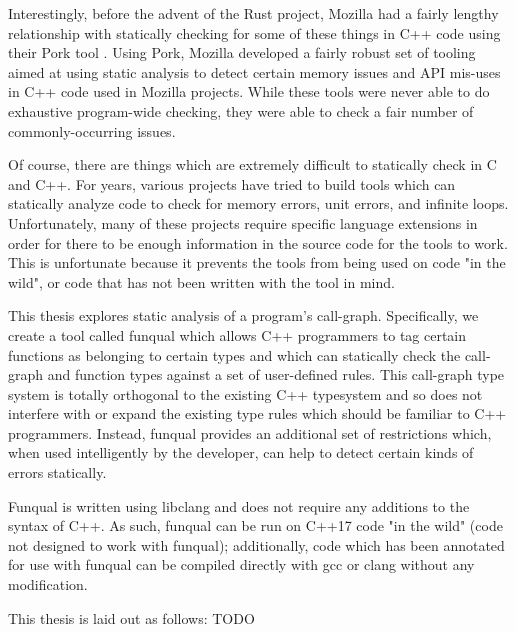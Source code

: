 Interestingly, before the advent of the Rust project, Mozilla had a fairly lengthy relationship with statically checking for some of these things in C++ code using their Pork tool \cite{mozilla-pork, mozilla-pork-blog}.  Using Pork, Mozilla developed a fairly robust set of tooling aimed at using static analysis to detect certain memory issues and API mis-uses in C++ code used in Mozilla projects.  While these tools were never able to do exhaustive program-wide checking, they were able to check a fair number of commonly-occurring issues.  

Of course, there are things which are extremely difficult to statically check in C and C++.  For years, various projects have tried to build tools which can statically analyze code to check for memory errors, unit errors, and infinite loops.  Unfortunately, many of these projects require specific language extensions in order for there to be enough information in the source code for the tools to work.  This is unfortunate because it prevents the tools from being used on code "in the wild", or code that has not been written with the tool in mind.

This thesis explores static analysis of a program's call-graph.  Specifically, we create a tool called funqual which allows C++ programmers to tag certain functions as belonging to certain types and which can statically check the call-graph and function types against a set of user-defined rules.  This call-graph type system is totally orthogonal to the existing C++ typesystem and so does not interfere with or expand the existing type rules which should be familiar to C++ programmers.  Instead, funqual provides an additional set of restrictions which, when used intelligently by the developer, can help to detect certain kinds of errors statically.

Funqual is written using libclang and does not require any additions to the syntax of C++.  As such, funqual can be run on C++17 code "in the wild" (code not designed to work with funqual);  additionally, code which has been annotated for use with funqual can be compiled directly with gcc or clang without any modification.  

This thesis is laid out as follows: TODO





